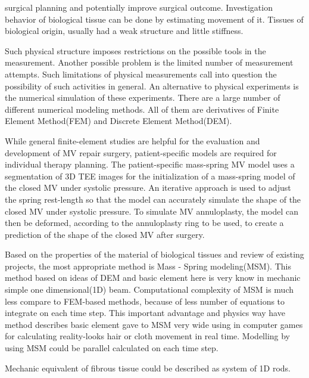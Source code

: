surgical planning and potentially improve surgical outcome. Investigation
behavior of biological tissue can be done by estimating movement of it. Tissues
of biological origin, usually had a weak structure and little stiffness.
\par
Such physical structure imposes restrictions on the possible tools in the
measurement. Another possible problem is the limited number of measurement
attempts. Such limitations of physical measurements call into question the
possibility of such activities in general. An alternative to physical
experiments is the numerical simulation of these experiments. There are a large
number of different numerical modeling methods. All of them are derivatives of
Finite Element Method(FEM) and Discrete Element Method(DEM).
\par
While general finite-element studies are helpful for the evaluation and
development of MV repair surgery, patient-specific models are required for
individual therapy planning.
The patient-specific mass-spring MV model uses a segmentation of 3D TEE images
for the initialization of a mass-spring model of the closed MV under systolic
pressure. An iterative approach is used to adjust the spring rest-length so that
the model can accurately simulate the shape of the closed MV under systolic
pressure. To simulate MV annuloplasty, the model can then be deformed, according
to the annuloplasty ring to be used, to create a prediction of the shape of the
closed MV after surgery.
\par
Based on the properties of the material of biological tissues and review of
existing projects, the most appropriate method is Mass - Spring modeling(MSM). This
method based on ideas of DEM and basic element here is very know in mechanic
simple one dimensional(1D) beam.
Computational complexity of MSM is much less compare to FEM-based methods,
because of less number of equations to integrate on each time step. This
important advantage and physics way have method describes basic element gave to
MSM very wide using in computer games for calculating reality-looks hair or
cloth movement in real time. Modelling by using MSM could be parallel calculated
on each time step.\cite{Rasmusson2008} \cite{Amorim2012}
\par
Mechanic equivalent of fibrous tissue could be described as system of 1D rods.
